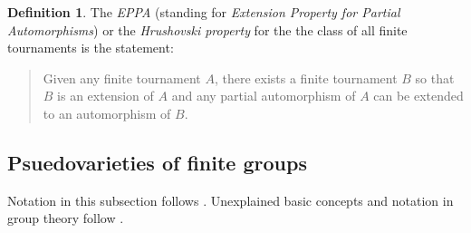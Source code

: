 \documentclass[11pt]{amsart}
\newtheorem{theorem}{Theorem}[section]
\theoremstyle{definition}
\newtheorem{definition}[theorem]{Definition}
\newtheorem{problem}[theorem]{Problem}
\theoremstyle{definition}
\numberwithin{equation}{section}
\begin{document}

\begin{definition} The {\em EPPA} (standing for {\em Extension Property for Partial Automorphisms}) or the {\em Hrushovski property} for the the class of all finite tournaments is the statement:
\begin{quote}
 Given any finite tournament $A$, there exists a finite tournament $B$ so that $B$ is an extension of $A$ and any partial automorphism of $A$ can be extended to an automorphism of $B$.
 \end{quote}
 \end{definition}


\subsection{Psuedovarieties of finite groups}
Notation in this subsection follows \cite{RZBook}. Unexplained basic concepts and notation in group theory follow \cite{RobinsonBook}.
\end{document}
